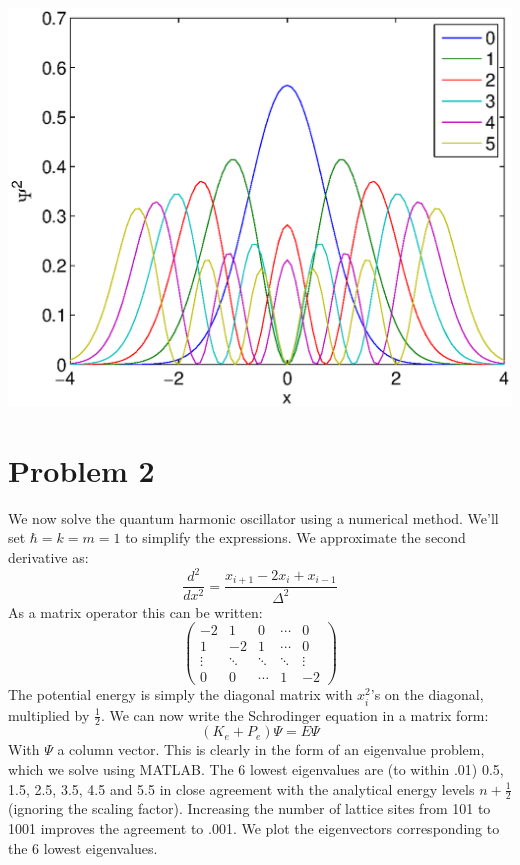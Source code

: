 \documentclass[a4paper,10pt]{article}
\numberwithin{equation}{section}
\begin{document}
\includegraphics{analytic}
\section{Problem 2}
We now solve the quantum harmonic oscillator using a numerical method.
We'll set $\hbar =k=m=1$ to simplify the expressions.
We approximate the second derivative as:
\begin{equation}
\frac{d^2}{dx^2}=\frac{x_{i+1}-2x_{i}+x_{i-1}}{\Delta ^2} 
\end{equation}
As a matrix operator this can be written:
\begin{equation}
\begin{pmatrix}
-2 & 1 & 0 & \cdots & 0\\
1 & -2 & 1 & \cdots & 0 \\
\vdots & \ddots & \ddots & \ddots & \vdots\\
0 & 0 & \cdots & 1 & -2
\end{pmatrix}
\end{equation}
The potential energy is simply the diagonal matrix with $x_i^2$'s on the diagonal, multiplied by $\frac{1}{2}$.
We can now write the Schrodinger equation in a matrix form:
\begin{equation}
(K_e+P_e)\Psi=E\Psi 
\end{equation}
With $\Psi$ a column vector. This is clearly in the form of an eigenvalue problem, which we solve using MATLAB. 
The 6 lowest eigenvalues are (to within .01) 0.5, 1.5, 2.5, 3.5, 4.5 and 5.5 in close agreement with the analytical energy levels $n+\frac{1}{2}$ (ignoring the scaling factor). 
Increasing the number of lattice sites from 101 to 1001 improves the agreement to .001.
We plot the eigenvectors corresponding to the 6 lowest eigenvalues.
\linebreak
\end{document}
